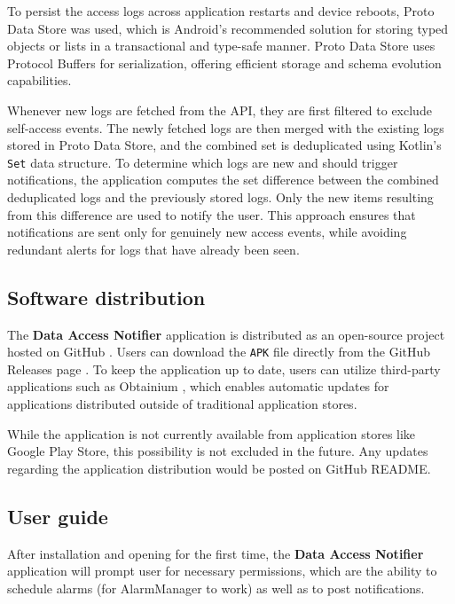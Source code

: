 To persist the access logs across application restarts and device reboots, Proto Data Store was used, which is Android's recommended solution for storing typed objects or lists in a transactional and type-safe manner. Proto Data Store uses Protocol Buffers \cite{protocol-buffers} for serialization, offering efficient storage and schema evolution capabilities.

Whenever new logs are fetched from the API, they are first filtered to exclude self-access events. The newly fetched logs are then merged with the existing logs stored in Proto Data Store, and the combined set is deduplicated using Kotlin's \texttt{Set} data structure. To determine which logs are new and should trigger notifications, the application computes the set difference between the combined deduplicated logs and the previously stored logs. Only the new items resulting from this difference are used to notify the user. This approach ensures that notifications are sent only for genuinely new access events, while avoiding redundant alerts for logs that have already been seen.

\subsection{Software distribution}

The \textbf{Data Access Notifier} application is distributed as an open-source project hosted on GitHub \cite{data-access-notifier}. Users can download the \texttt{APK} file directly from the GitHub Releases page \cite{data-access-notifier-releases}. To keep the application up to date, users can utilize third-party applications such as Obtainium \cite{obtainium}, which enables automatic updates for applications distributed outside of traditional application stores.

While the application is not currently available from application stores like Google Play Store, this possibility is not excluded in the future. Any updates regarding the application distribution would be posted on GitHub README.

\subsection{User guide}
After installation and opening for the first time, the \textbf{Data Access Notifier} application will prompt user for necessary permissions, which are the ability to schedule alarms (for AlarmManager to work) as well as to post notifications.


